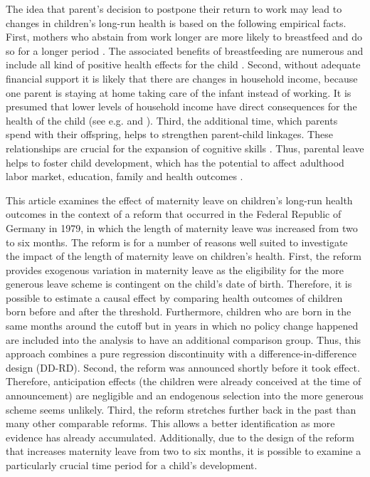 \documentclass[a4paper ]{article}
\begin{document}
The idea that parent's decision to postpone their return to work may lead to changes in children's long-run health is based on the following empirical facts. First, mothers who abstain from work longer are more likely to breastfeed and do so for a longer period \citep{berger2005maternity}. The associated benefits of breastfeeding are numerous and include all kind of positive health effects for the child \citep{horta2007evidence}. Second, without adequate financial support it is likely that there are changes in household income, because one parent is staying at home taking care of the infant instead of working. It is presumed that lower levels of household income have direct consequences for the health of the child (see e.g. \cite{case2002economic} and \cite{hoynes2015income}). Third, the additional time, which parents spend with their offspring, helps to strengthen parent-child linkages. These relationships are crucial for the expansion of cognitive skills \citep{klaus1998mother}. Thus, parental leave helps to foster child development, which has the potential to affect adulthood labor market, education, family and health outcomes \citep{currie2011human}.\newline

This article examines the effect of maternity leave on children's long-run health outcomes in the context of a reform that occurred in the Federal Republic of Germany in 1979, in which the length of maternity leave was increased from two to six months. The reform is for a number of reasons well suited to investigate the impact of the length of maternity leave on children's health. First, the reform provides exogenous variation in maternity leave as the eligibility for the more generous leave scheme is contingent on the child's date of birth. Therefore, it is possible to estimate a causal effect by comparing health outcomes of children born before and after the threshold. Furthermore, children who are born in the same months around the cutoff but in years in which no policy change happened are included into the analysis to have an additional comparison group. Thus, this approach combines a pure regression discontinuity with a difference-in-difference design (DD-RD).
Second, the reform was announced shortly before it took effect. Therefore, anticipation effects (the children were already conceived at the time of announcement) are negligible and an endogenous selection into the more generous scheme seems unlikely. 
Third, the reform stretches further back in the past than many other comparable reforms. This allows a better identification as more evidence has already accumulated. Additionally, due to the design of the reform that increases maternity leave from two to six months, it is possible  to examine a particularly crucial time period for a child's development.  \newline
\end{document}
